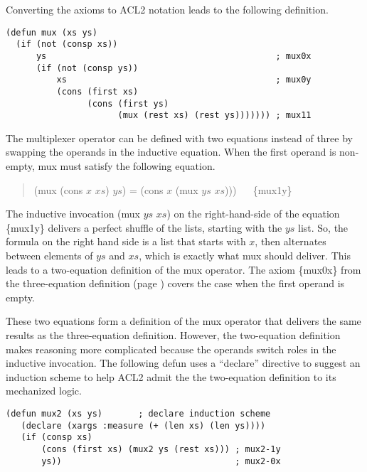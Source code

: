 Converting the axioms to ACL2 notation leads to the following
definition.

\label{mux-defun}
\begin{Verbatim}
(defun mux (xs ys)
  (if (not (consp xs))
      ys                                             ; mux0x
      (if (not (consp ys))
          xs                                         ; mux0y
          (cons (first xs)
                (cons (first ys)
                      (mux (rest xs) (rest ys))))))) ; mux11
\end{Verbatim}

\begin{aside}
The multiplexer operator can be defined with two equations instead of three
by swapping the operands in the inductive equation.
When the first operand is non-empty, mux must satisfy the following equation.
\begin{quote}
(mux (cons $x$ $xs$) $ys$) = (cons $x$ (mux $ys$ $xs$))) ~~ \{mux1y\}
\end{quote}

The inductive invocation (mux $ys$ $xs$)
on the right-hand-side of the equation \{mux1y\}
delivers a perfect shuffle of the lists,
starting with the $ys$ list.
So, the formula on the right hand side is a list that starts with $x$,
then alternates between elements of $ys$ and $xs$, which is exactly what
mux should deliver. This leads to a two-equation definition of the mux operator.
The axiom \{mux0x\} from the three-equation definition
(page \pageref{def:mux})
covers the case when the first operand is empty.

These two equations form a definition of the mux operator
that delivers the same results as the three-equation definition.
However, the two-equation definition makes reasoning more complicated
because the operands switch roles in the inductive invocation.
The following defun uses a ``declare'' directive to suggest
an induction scheme to help ACL2 admit
the the two-equation definition to its mechanized logic.

\label{mux-2eq-defun}
\begin{Verbatim}
(defun mux2 (xs ys)       ; declare induction scheme
   (declare (xargs :measure (+ (len xs) (len ys))))
   (if (consp xs)
       (cons (first xs) (mux2 ys (rest xs))) ; mux2-1y
       ys))                                  ; mux2-0x
\end{Verbatim}

\caption{Defining mux with Two Equations}
\label{aside:mux-2eq}
\end{aside}

